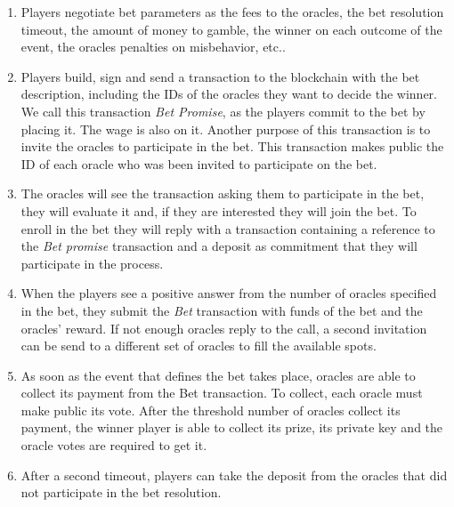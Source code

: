 \begin{enumerate}
  \item Players negotiate bet parameters as the fees to the oracles, the bet
      resolution timeout, the amount of money to gamble, the winner on each
      outcome of the event, the oracles penalties on misbehavior, etc..
  \item Players build, sign and send a transaction to the blockchain with the
      bet description, including the IDs of the oracles they want to decide the
      winner.
        We call this transaction \textit{Bet Promise}, as the players commit to the bet
      by placing it. The wage is also on it.
    Another purpose of this transaction is to invite the oracles to participate
      in the bet.
    This transaction makes public the ID of each oracle who was been invited
      to participate on the bet.
  \item The oracles will see the transaction asking them to participate in the
      bet, they will evaluate it and, if they are interested they will join the
      bet.
    To enroll in the bet they will reply with a transaction containing a
        reference to the \textit{Bet promise} transaction and a deposit as commitment
      that they will participate in the process.
  \item When the players see a positive answer from the number of oracles
      specified in the bet, they submit the \textit{Bet} transaction with funds of
      the bet and the oracles' reward.
  	If not enough oracles reply to the call, a second invitation can be send to
  	  a different set of oracles to fill the available spots.
  \item As soon as the event that defines the bet  takes place, oracles are able
      to collect its payment from the Bet transaction.
      To collect, each oracle must make public its vote.
  	After the threshold number of oracles collect its payment, the winner player
  	  is able to collect its prize, its private key and the oracle votes are
  	  required to get it.
  \item After a second timeout, players can take the deposit from the oracles
  	  that did not participate in the bet resolution.
\end{enumerate}

